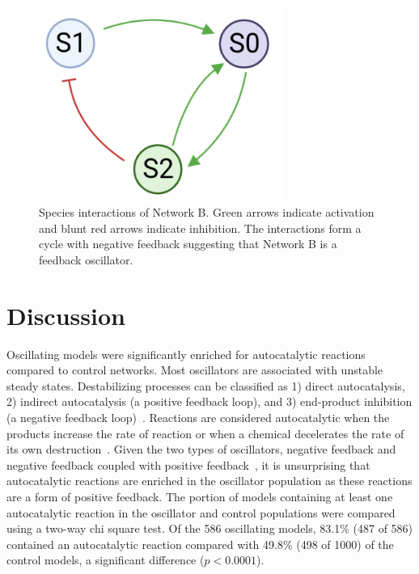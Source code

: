 \documentclass[12pt]{report}
\begin{document}
\begin{figure}
	\centering
    \includegraphics[width=8cm]{images/feedback-cycle.png}
    \caption[Feedback diagram of an oscillating network]{Species interactions of Network B. Green arrows indicate activation and blunt red arrows indicate inhibition. The interactions form a cycle with negative feedback suggesting that Network B is a feedback oscillator.}
    \label{fig:feedback}
\end{figure}


\section{Discussion}

Oscillating models were significantly enriched for autocatalytic reactions compared to control networks. Most oscillators are associated with unstable steady states. Destabilizing processes can be classified as 1) direct autocatalysis, 2) indirect autocatalysis (a positive feedback loop), and 3) end-product inhibition (a negative feedback loop)~\cite{Tyson1975, tyson2007}. Reactions are considered autocatalytic when the products increase the rate of reaction or when a chemical decelerates the rate of its own destruction~\cite{Tyson2004}. Given the two types of oscillators, negative feedback and negative feedback coupled with positive feedback~\cite{Sauro_dynamics}, it is unsurprising that autocatalytic reactions are enriched in the oscillator population as these reactions are a form of positive feedback. The portion of models containing at least one autocatalytic reaction in the oscillator and control populations were compared using a two-way chi square test. Of the 586 oscillating models, 83.1\% (487 of 586) contained an autocatalytic reaction compared with 49.8\% (498 of 1000) of the control models, a significant difference ($p < 0.0001$). 
\end{document}
